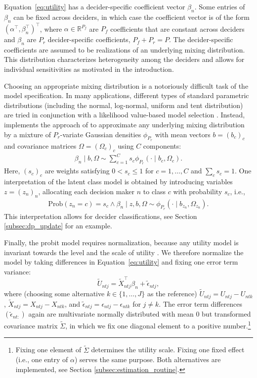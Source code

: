 \documentclass[article,shortnames]{jss}
\begin{document}
Equation~\ref{eq:utility} has a decider-specific coefficient vector $\beta_n$. Some entries of $\beta_n$ can be fixed across deciders, in which case the coefficient vector is of the form $(\alpha^\top, \beta_n^\top)^\top$, where $\alpha \in \mathbb{R}^{P_f}$ are $P_f$ coefficients that are constant across deciders and $\beta_n$ are $P_r$ decider-specific coefficients, $P_f + P_r = P$. The decider-specific coefficients are assumed to be realizations of an underlying mixing distribution. This distribution characterizes heterogeneity among the deciders and allows for individual sensitivities as motivated in the introduction.

Choosing an appropriate mixing distribution is a notoriously difficult task of the model specification. In many applications, different types of standard parametric distributions (including the normal, log-normal, uniform and tent distribution) are tried in conjunction with a likelihood value-based model selection \citep[pp.\ 136 ff.]{Train:2009}. Instead,  implements the approach of \cite{Oelschlaeger:2020} to approximate any underlying mixing distribution by a mixture of $P_r$-variate Gaussian densities $\phi_{P_r}$ with mean vectors $b=(b_c)_{c}$ and covariance matrices $\Omega=(\Omega_c)_{c}$ using $C$ components:
%
\begin{align*}
\beta_n\mid b,\Omega \sim \sum_{c=1}^{C} s_c \phi_{P_r} (\cdot \mid b_c,\Omega_c).
\end{align*}
%
Here, $(s_c)_{c}$ are weights satisfying $0 < s_c\leq 1$ for $c=1,\dots,C$ and $\sum_c s_c=1$. One interpretation of the latent class model is obtained by introducing variables $z=(z_n)_n$, allocating each decision maker $n$ to class $c$ with probability $s_c$, i.e.,
%
\begin{align*}
\text{Prob}(z_n=c)=s_c \land \beta_n \mid z,b,\Omega \sim \phi_{P_r}(\cdot \mid b_{z_n},\Omega_{z_n}).
\end{align*}
%
This interpretation allows for decider classifications, see Section \ref{subsec:dp_update} for an example.

Finally, the probit model requires normalization, because any utility model is invariant towards the level and the scale of utility \citep[Ch.\ 2]{Train:2009}. We therefore normalize the model by taking differences in Equation~\ref{eq:utility} and fixing one error term variance:
%
\begin{equation}
\label{eq:utility_diff}
\tilde{U}_{ntj} = \tilde{X}_{ntj}^\top \beta_n + \tilde{\epsilon}_{ntj},
\end{equation}
%
where (choosing some alternative $k \in \{1,\dots,J\}$ as the reference) $\tilde{U}_{ntj} = U_{ntj} - U_{ntk}$, $\tilde{X}_{ntj} = X_{ntj} - X_{ntk}$, and $\tilde{\epsilon}_{ntj} = \epsilon_{ntj} - \epsilon_{ntk}$ for $j\neq k$. The error term differences $(\tilde{\epsilon}_{nt:})$ again are multivariate normally distributed with mean 0 but transformed covariance matrix $\tilde{\Sigma}$, in which we fix one diagonal element to a positive number.\footnote{Fixing one element of $\tilde{\Sigma}$ determines the utility scale. Fixing one fixed effect (i.e., one entry of $\alpha$) serves the same purpose. Both alternatives are implemented, see Section \ref{subsec:estimation_routine}.}
\end{document}

